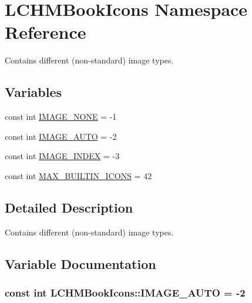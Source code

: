 \hypertarget{namespaceLCHMBookIcons}{\section{L\+C\+H\+M\+Book\+Icons Namespace Reference}
\label{namespaceLCHMBookIcons}
}


Contains different (non-\/standard) image types.  


\subsection*{Variables}
\begin{DoxyCompactItemize}
\item 
const int \hyperlink{namespaceLCHMBookIcons_a6061f38655b7c0a3bd7540c324aad060}{I\+M\+A\+G\+E\+\_\+\+N\+O\+N\+E} = -\/1
\item 
const int \hyperlink{namespaceLCHMBookIcons_a0f3c670d267683e807f02d1cfa010518}{I\+M\+A\+G\+E\+\_\+\+A\+U\+T\+O} = -\/2
\item 
const int \hyperlink{namespaceLCHMBookIcons_a53f976419fbc01639c4cd57090e11c2f}{I\+M\+A\+G\+E\+\_\+\+I\+N\+D\+E\+X} = -\/3
\item 
const int \hyperlink{namespaceLCHMBookIcons_aa8a657bb1bcac77ff0c2b590a1cd8e2e}{M\+A\+X\+\_\+\+B\+U\+I\+L\+T\+I\+N\+\_\+\+I\+C\+O\+N\+S} = 42
\end{DoxyCompactItemize}


\subsection{Detailed Description}
Contains different (non-\/standard) image types. 

\subsection{Variable Documentation}
\hypertarget{namespaceLCHMBookIcons_a0f3c670d267683e807f02d1cfa010518}{
\subsubsection[{I\+M\+A\+G\+E\+\_\+\+A\+U\+T\+O}]{\setlength{\rightskip}{0pt plus 5cm}const int L\+C\+H\+M\+Book\+Icons\+::\+I\+M\+A\+G\+E\+\_\+\+A\+U\+T\+O = -\/2}}\label{namespaceLCHMBookIcons_a0f3c670d267683e807f02d1cfa010518}


